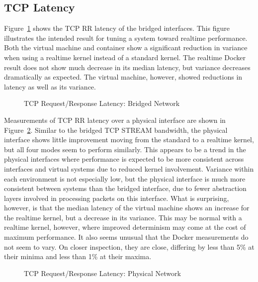 \subsection{TCP Latency} %
\label{sub:tcplatency}
Figure~\ref{fig:tcp_rr_bridge} shows the TCP RR latency of the bridged interfaces.
This figure illustrates the intended result for tuning a system toward realtime performance.
Both the virtual machine and container show a significant reduction in variance when using a realtime kernel instead of a standard kernel.
The realtime Docker result does not show much decrease in its median latency, but variance decreases dramatically as expected.
The virtual machine, however, showed reductions in latency as well as its variance.

\begin{figure}
    \centering
    \def\svgwidth{\columnwidth}
    
    \caption{TCP Request/Response Latency: Bridged Network}
    \label{fig:tcp_rr_bridge}
\end{figure}

Measurements of TCP RR latency over a physical interface are shown in Figure~\ref{fig:tcp_rr_phys}.  
Similar to the bridged TCP STREAM bandwidth, the physical interface shows little improvement moving from the standard to a realtime kernel, but all four modes seem to perform similarly.
This appears to be a trend in the physical interfaces where performance is expected to be more consistent across interfaces and virtual systems due to reduced kernel involvement.
Variance within each environment is not especially low, but the physical interface is much more consistent between systems than the bridged interface, due to fewer abstraction layers involved in processing packets on this interface. 
What is surprising, however, is that the median latency of the virtual machine shows an increase for the realtime kernel, but a decrease in its variance.  
This may be normal with a realtime kernel, however, where improved determinism may come at the cost of maximum performance.  
It also seems unusual that the Docker measurements do not seem to vary.  
On closer inspection, they are close, differing by less than 5\% at their minima and less than 1\% at their maxima.

\begin{figure}
    \centering
    \def\svgwidth{\columnwidth}
    
    \caption{TCP Request/Response Latency: Physical Network}
    \label{fig:tcp_rr_phys}
\end{figure}

